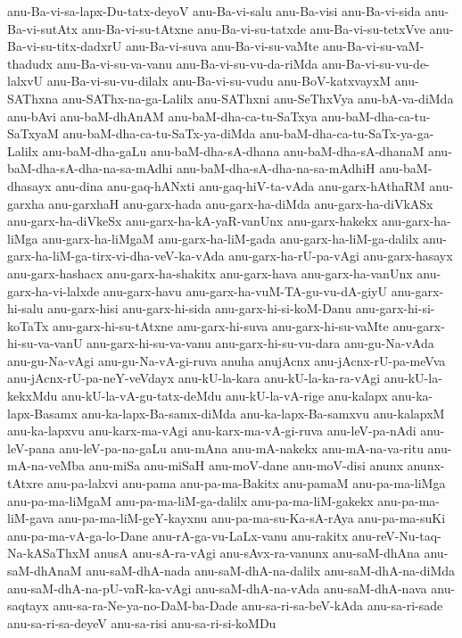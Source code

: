 {anu-Ba-vi-sa-lapx-Du-tatx-deyoV
anu-Ba-vi-salu
anu-Ba-visi
anu-Ba-vi-sida
anu-Ba-vi-sutAtx
anu-Ba-vi-su-tAtxne
anu-Ba-vi-su-tatxde
anu-Ba-vi-su-tetxVve
anu-Ba-vi-su-titx-dadxrU
anu-Ba-vi-suva
anu-Ba-vi-su-vaMte
anu-Ba-vi-su-vaM-thadudx
anu-Ba-vi-su-va-vanu
anu-Ba-vi-su-vu-da-riMda
anu-Ba-vi-su-vu-de-lalxvU
anu-Ba-vi-su-vu-dilalx
anu-Ba-vi-su-vudu
anu-BoV-katxvayxM
anu-SAThxna
anu-SAThx-na-ga-Lalilx
anu-SAThxni
anu-SeThxVya
anu-bA-va-diMda
anu-bAvi
anu-baM-dhAnAM
anu-baM-dha-ca-tu-SaTxya
anu-baM-dha-ca-tu-SaTxyaM
anu-baM-dha-ca-tu-SaTx-ya-diMda
anu-baM-dha-ca-tu-SaTx-ya-ga-Lalilx
anu-baM-dha-gaLu
anu-baM-dha-sA-dhana
anu-baM-dha-sA-dhanaM
anu-baM-dha-sA-dha-na-sa-mAdhi
anu-baM-dha-sA-dha-na-sa-mAdhiH
anu-baM-dhasayx
anu-dina
anu-gaq-hANxti
anu-gaq-hiV-ta-vAda
anu-garx-hAthaRM
anu-garxha
anu-garxhaH
anu-garx-hada
anu-garx-ha-diMda
anu-garx-ha-diVkASx
anu-garx-ha-diVkeSx
anu-garx-ha-kA-yaR-vanUnx
anu-garx-hakekx
anu-garx-ha-liMga
anu-garx-ha-liMgaM
anu-garx-ha-liM-gada
anu-garx-ha-liM-ga-dalilx
anu-garx-ha-liM-ga-tirx-vi-dha-veV-ka-vAda
anu-garx-ha-rU-pa-vAgi
anu-garx-hasayx
anu-garx-hashacx
anu-garx-ha-shakitx
anu-garx-hava
anu-garx-ha-vanUnx
anu-garx-ha-vi-lalxde
anu-garx-havu
anu-garx-ha-vuM-TA-gu-vu-dA-giyU
anu-garx-hi-salu
anu-garx-hisi
anu-garx-hi-sida
anu-garx-hi-si-koM-Danu
anu-garx-hi-si-koTaTx
anu-garx-hi-su-tAtxne
anu-garx-hi-suva
anu-garx-hi-su-vaMte
anu-garx-hi-su-va-vanU
anu-garx-hi-su-va-vanu
anu-garx-hi-su-vu-dara
anu-gu-Na-vAda
anu-gu-Na-vAgi
anu-gu-Na-vA-gi-ruva
anuha
anujAcnx
anu-jAcnx-rU-pa-meVva
anu-jAcnx-rU-pa-neY-veVdayx
anu-kU-la-kara
anu-kU-la-ka-ra-vAgi
anu-kU-la-kekxMdu
anu-kU-la-vA-gu-tatx-deMdu
anu-kU-la-vA-rige
anu-kalapx
anu-ka-lapx-Basamx
anu-ka-lapx-Ba-samx-diMda
anu-ka-lapx-Ba-samxvu
anu-kalapxM
anu-ka-lapxvu
anu-karx-ma-vAgi
anu-karx-ma-vA-gi-ruva
anu-leV-pa-nAdi
anu-leV-pana
anu-leV-pa-na-gaLu
anu-mAna
anu-mA-nakekx
anu-mA-na-va-ritu
anu-mA-na-veMba
anu-miSa
anu-miSaH
anu-moV-dane
anu-moV-disi
anunx
anunx-tAtxre
anu-pa-lalxvi
anu-pama
anu-pa-ma-Bakitx
anu-pamaM
anu-pa-ma-liMga
anu-pa-ma-liMgaM
anu-pa-ma-liM-ga-dalilx
anu-pa-ma-liM-gakekx
anu-pa-ma-liM-gava
anu-pa-ma-liM-geY-kayxnu
anu-pa-ma-su-Ka-sA-rAya
anu-pa-ma-suKi
anu-pa-ma-vA-ga-lo-Dane
anu-rA-ga-vu-LaLx-vanu
anu-rakitx
anu-reV-Nu-taq-Na-kASaThxM
anusA
anu-sA-ra-vAgi
anu-sAvx-ra-vanunx
anu-saM-dhAna
anu-saM-dhAnaM
anu-saM-dhA-nada
anu-saM-dhA-na-dalilx
anu-saM-dhA-na-diMda
anu-saM-dhA-na-pU-vaR-ka-vAgi
anu-saM-dhA-na-vAda
anu-saM-dhA-nava
anu-saqtayx
anu-sa-ra-Ne-ya-no-DaM-ba-Dade
anu-sa-ri-sa-beV-kAda
anu-sa-ri-sade
anu-sa-ri-sa-deyeV
anu-sa-risi
anu-sa-ri-si-koMDu
}
